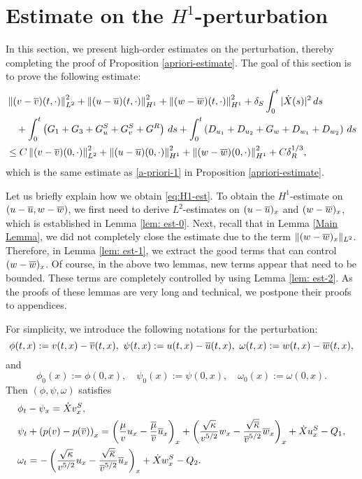 \documentclass[11pt,reqno]{amsart}
\begin{document}
\section{Estimate on the $H^1$-perturbation}\label{sec:high-order}
\setcounter{equation}{0}
In this section, we present high-order estimates on the perturbation, thereby completing the proof of Proposition \ref{apriori-estimate}. The goal of this section is to prove the following estimate:
\begin{equation}
\begin{aligned}\label{eq:H1-est}
	& \left\lVert(v-\overline{v})(t,\cdot)\right\rVert_{L^2}^2 +\left\lVert(u-\overline{u})(t,\cdot)\right\rVert_{H^1}^2+\left\lVert(w-\overline{w})(t,\cdot)\right\rVert_{H^1}^2+\delta_S \int_0^t | \dot{X}(s)|^2 \, d s \\ 
	&\quad +\int_0^t \left( G_1+G_3+G^S_u+G^S_v+G^R \right) \, ds +  \int_0^t \left( D_{u_1} + D_{u_2} + G_{w} + D_{w_1} + D_{w_2} \right)\, ds  \\ 
	& \le C \left\lVert(v-\overline{v})(0,\cdot)\right\rVert_{L^2}^2 +\left\lVert(u-\overline{u})(0,\cdot)\right\rVert_{H^1}^2+\left\lVert(w-\overline{w})(0,\cdot)\right\rVert_{H^1}^2+C\delta_R^{1/3},
\end{aligned}
\end{equation}
which is the same estimate as \eqref{a-priori-1} in Proposition \ref{apriori-estimate}.

Let us briefly explain how we obtain \eqref{eq:H1-est}. To obtain the $H^1$-estimate on $(u-\overline{u},w-\overline{w})$, we first need to derive $L^2$-estimates on $(u-\overline{u})_x$ and $(w-\overline{w})_x$, which is established in Lemma \ref{lem: est-0}. Next, recall that in Lemma \ref{Main Lemma}, we did not completely close the estimate due to the term $\|(w-\overline{w})_x\|_{L^2}$. Therefore, in Lemma \ref{lem: est-1}, we extract the good terms that can control $(w-\overline{w})_x$. Of course, in the above two lemmas, new terms appear that need to be bounded. These terms are completely controlled by using Lemma \ref{lem: est-2}. As the proofs of these lemmas are very long and technical, we postpone their proofs to appendices.

For simplicity, we introduce the following notations for the perturbation:
\begin{equation*} %
\phi(t,x):=v(t,x)-\ov(t,x),\ \psi(t,x):=u(t,x)-\ou(t,x),\ \omega (t,x):=w(t,x)-\ow(t,x),
\end{equation*}
and
\[\phi_0(x):=\phi(0,x),\quad \psi_0(x):=\psi(0,x),\quad \omega_0(x):=\omega(0,x).\]
Then $(\phi,\psi,\omega)$ satisfies 
\begin{equation} \label{Underlying wave with shift}
\begin{aligned}
&\phi_t-\psi_x=\dot{X} v^S_x,\\
&\psi_t + \left(p(v)-p(\overline{v}) \right)_x = \left( \frac{\mu}{v} u_x-\frac{\overline{\mu}}{\overline{v}} \overline{u}_x \right)_x + \left( \frac{\sqrt{\kappa}}{v^{5/2}} w_x - \frac{\sqrt{\overline{\kappa}}}{\overline{v}^{5/2}} \overline{w}_x\right)_x + \dot{X} u^S_x -Q_1,\\
&\omega _t= -\left( \frac{\sqrt{\kappa}}{v^{5/2}} u_x - \frac{\sqrt{\overline{\kappa}}}{\overline{v}^{5/2}} \overline{u}_x \right)_x + \dot{X} w^S_x -Q_2.
\end{aligned}
\end{equation}
\end{document}

